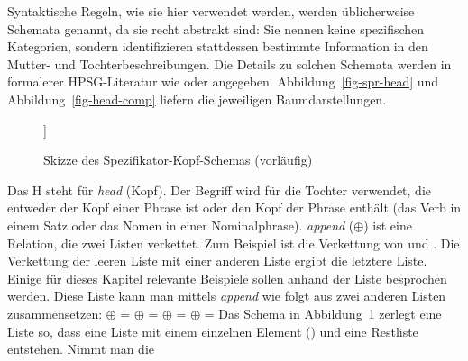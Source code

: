 \noindent
Syntaktische Regeln, wie sie hier verwendet werden, werden üblicherweise Schemata genannt, da sie recht abstrakt sind: Sie
nennen keine spezifischen Kategorien, sondern identifizieren stattdessen bestimmte Information in den Mutter- und Tochterbeschreibungen.
Die Details zu solchen Schemata werden in formalerer HPSG-Literatur wie
 oder  angegeben. Abbildung~\vref{fig-spr-head} und
Abbildung~\vref{fig-head-comp} liefern die jeweiligen Baumdarstellungen.
\begin{figure}
\begin{forest}
[H\feattab{\spr \ibox{1}}%
  [\ibox{2}]
  [H\feattab{\spr \ibox{1} $\oplus$ \sliste{ \ibox{2} },\\
             \comps \eliste}
  ]]
\end{forest}
\caption{\label{fig-spr-head}Skizze des Spezifikator-Kopf-Schemas (vorläufig)}
\end{figure}
Das H steht für \emph{head} (Kopf). Der Begriff  wird für die Tochter verwendet, die entweder
der Kopf einer Phrase ist oder den Kopf der Phrase enthält (\zb das Verb in einem Satz oder das Nomen in einer
Nominalphrase). \emph{append} ($\oplus$) ist eine Relation, die zwei
Listen verkettet. Zum Beispiel ist die Verkettung von  und 
. Die Verkettung der leeren Liste \eliste{} mit einer anderen Liste ergibt
die letztere Liste. Einige für dieses Kapitel relevante Beispiele sollen anhand der Liste
 besprochen werden. Diese Liste kann man
mittels \emph{append} wie folgt aus zwei anderen Listen zusammensetzen:
\eal
\ex \eliste{} $\oplus$  = 
\ex {} $\oplus$  = 
\ex {} $\oplus$  = 
\ex {} $\oplus$ \eliste{} = 
\zl
Das Schema in Abbildung~\ref{fig-spr-head} zerlegt eine Liste so, dass eine Liste mit einem
einzelnen Element () und eine Restliste  entstehen. Nimmt man die
